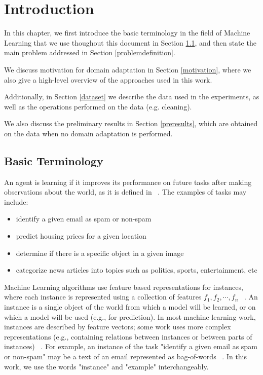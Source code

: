 \cleardoublepage

\chapter{Introduction}
\label{introduction}

In this chapter, we first introduce the basic terminology in the field of Machine Learning that we use thoughout this document in Section \ref{basicterminology}, and then state the main problem addressed in Section \ref{problemdefinition}. 

We discuss motivation for domain adaptation in Section \ref{motivation}, where we also give a high-level overview of the approaches used in this work. 

Additionally,  in Section \ref{dataset} we describe the data used in the experiments, as well as the operations performed on the data (e.g. cleaning). 

We also discuss the preliminary results in Section \ref{preresults}, which are obtained on the data when no domain adaptation is performed.

\section{Basic Terminology}
\label{basicterminology}

An agent is learning if it improves its performance on future tasks after making observations
about the world, as it is defined in ~\citep{rn}. The examples of tasks may include: 
\begin{itemize}
  \item identify a given email as spam or non-spam
  \item predict housing prices for a given location
  \item determine if there is a specific object in a given image
  \item categorize news articles into topics such as politics, sports, entertainment, etc
\end{itemize}

Machine Learning algorithms use feature based representations for instances, where each instance is represented using a collection of features $f_1,f_2,\cdots,f_n$ ~\citep{tom}. An instance is a single object of the world from which a model will be learned, or on which a model will be used (e.g., for prediction). In most machine learning work, instances are described by feature vectors; some work uses more complex representations (e.g., containing relations between instances or between parts of instances) ~\citep{terms}. For example, an instance of the task "identify a given email as spam or non-spam" may be a text of an email represented as bag-of-words ~\citep{bagofwords}. In this work, we use the words "instance" and "example" interchangeably. 

